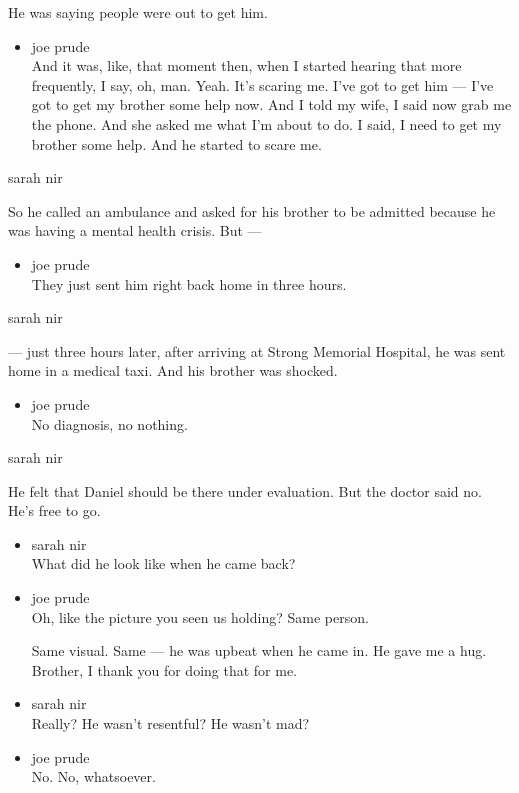 He was saying people were out to get him.

\begin{itemize}
\tightlist
\item
  joe prude\\
  And it was, like, that moment then, when I started hearing that more
  frequently, I say, oh, man. Yeah. It's scaring me. I've got to get him
  --- I've got to get my brother some help now. And I told my wife, I
  said now grab me the phone. And she asked me what I'm about to do. I
  said, I need to get my brother some help. And he started to scare me.
\end{itemize}

sarah nir

So he called an ambulance and asked for his brother to be admitted
because he was having a mental health crisis. But ---

\begin{itemize}
\tightlist
\item
  joe prude\\
  They just sent him right back home in three hours.
\end{itemize}

sarah nir

--- just three hours later, after arriving at Strong Memorial Hospital,
he was sent home in a medical taxi. And his brother was shocked.

\begin{itemize}
\tightlist
\item
  joe prude\\
  No diagnosis, no nothing.
\end{itemize}

sarah nir

He felt that Daniel should be there under evaluation. But the doctor
said no. He's free to go.

\begin{itemize}
\item
  sarah nir\\
  What did he look like when he came back?
\item
  joe prude\\
  Oh, like the picture you seen us holding? Same person.

  Same visual. Same --- he was upbeat when he came in. He gave me a hug.
  Brother, I thank you for doing that for me.
\item
  sarah nir\\
  Really? He wasn't resentful? He wasn't mad?
\item
  joe prude\\
  No. No, whatsoever.
\end{itemize}

